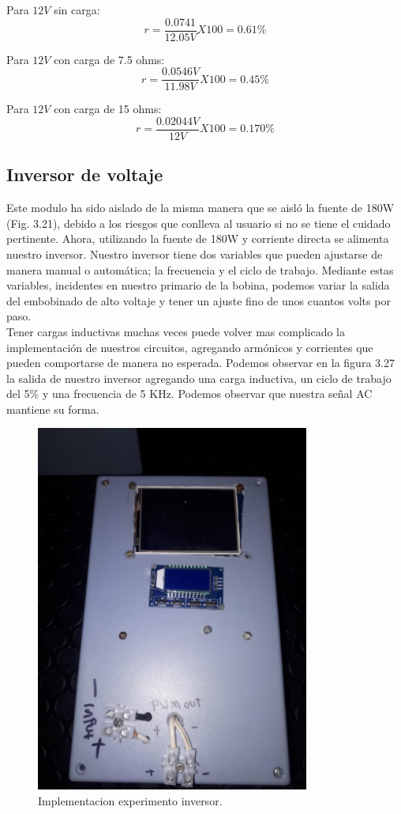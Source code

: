  
 Para $12V$ sin carga: $$r=\frac{0.0741}{12.05V}X100=0.61 \% $$ 
 
 Para $12V$ con carga de 7.5 ohms: $$r=\frac{0.0546V}{11.98V}X100=0.45 \% $$ 
 
 Para $12V$  con carga de 15 ohms: $$r=\frac{0.02044V}{12V}X100=0.170 \% $$



\subsection{Inversor de voltaje}

Este modulo ha sido aislado de la misma manera que se aisló la fuente de 180W (Fig. 3.21), debido a los riesgos que conlleva al usuario si no se tiene el cuidado pertinente. Ahora, utilizando la fuente de 180W y corriente directa se alimenta nuestro inversor. Nuestro inversor tiene dos variables que pueden ajustarse de manera manual o automática; la frecuencia y el ciclo de trabajo.  Mediante estas variables, incidentes en nuestro primario de la bobina, podemos variar la salida del embobinado de alto voltaje y tener un ajuste fino de unos cuantos volts por paso.\\

Tener cargas inductivas muchas veces puede volver mas complicado la implementación de nuestros circuitos, agregando armónicos y corrientes que pueden comportarse de manera no esperada. Podemos observar en la figura 3.27 la salida de nuestro inversor agregando una carga inductiva, un ciclo de trabajo del 5\% y una frecuencia de 5 KHz. Podemos observar que nuestra señal AC mantiene su forma.

\begin{figure}[H]
\centering
\includegraphics[width=9cm]{Capitulo3/figs/inversor.png}
\caption{Implementacion experimento inversor.}
\end{figure}

